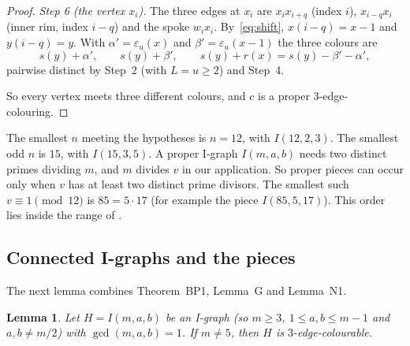 \documentclass[11pt]{amsart}
\theoremstyle{plain}
\newcommand{\letteredname}{}
\newtheorem*{letteredinner}{Lemma \letteredname}
\newenvironment{lettered}[1]{\renewcommand{\letteredname}{#1}\begin{letteredinner}}{\end{letteredinner}}
\theoremstyle{definition}
\theoremstyle{remark}
\numberwithin{equation}{section}
\begin{document}
\begin{proof}
\emph{Step 6 (the vertex \(x_i\)).} The three edges at \(x_i\) are \(x_ix_{i+q}\) (index \(i\)), \(x_{i-q}x_i\) (inner rim, index \(i-q\)) and the spoke \(w_ix_i\). By~\eqref{eq:shift}, \(x(i-q)=x-1\) and \(y(i-q)=y\). With \(\alpha'=\varepsilon_u(x)\) and \(\beta'=\varepsilon_u(x-1)\) the three colours are
\[
s(y)+\alpha',\qquad s(y)+\beta',\qquad s(y)+r(x)=s(y)-\beta'-\alpha',
\]
pairwise distinct by Step~2 (with \(L=u\ge2\)) and Step~4.

So every vertex meets three different colours, and \(c\) is a proper \(3\)-edge-colouring.
\end{proof}

The smallest \(n\) meeting the hypotheses is \(n=12\), with \(I(12,2,3)\). The smallest odd \(n\) is \(15\), with \(I(15,3,5)\). A proper I-graph \(I(m,a,b)\) needs two distinct primes dividing \(m\), and \(m\) divides \(v\) in our application. So proper pieces can occur only when \(v\) has at least two distinct prime divisors. The smallest such \(v\equiv1\pmod{12}\) is \(85=5\cdot17\) (for example the piece \(I(85,5,17)\)). This order lies inside the range of \cite[Theorem~3.1]{DPP}.

\subsection{Connected I-graphs and the pieces}

The next lemma combines Theorem~BP1, Lemma~G and Lemma~N1.

\begin{lettered}{D}
Let \(H=I(m,a,b)\) be an I-graph (so \(m\ge3\), \(1\le a,b\le m-1\) and \(a,b\ne m/2\)) with \(\gcd(m,a,b)=1\). If \(m\ne5\), then \(H\) is \(3\)-edge-colourable.
\end{lettered}
\end{document}
